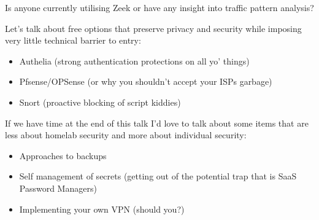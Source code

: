 \documentclass{beamer}
\begin{document}
\begin{frame}
    Is anyone currently utilising Zeek or have any insight into traffic pattern analysis?
\end{frame}

\begin{frame}
    Let's talk about free options that preserve privacy and security while imposing 
    very little technical barrier to entry:
    \begin{itemize}
        \item Authelia (strong authentication protections on all yo' things)
        \item Pfsense/OPSense (or why you shouldn't accept your ISPs garbage)
        \item Snort (proactive blocking of script kiddies)
    \end{itemize}
\end{frame}

\begin{frame}
    If we have time at the end of this talk I'd love to talk about some items that are
    less about homelab security and more about individual security:
    \begin{itemize}
        \item Approaches to backups
        \item Self management of secrets (getting out of the potential trap that is SaaS Password Managers)
        \item Implementing your own VPN (should you?)
    \end{itemize}
\end{frame}
\end{document}
